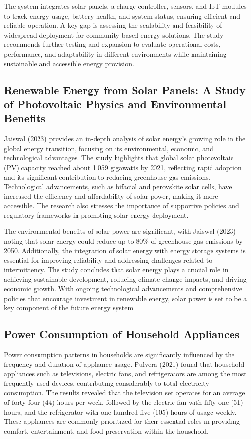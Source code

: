 {The system integrates solar panels, a charge controller, sensors, and IoT modules to track energy usage, battery health, and system status, ensuring efficient and reliable operation. A key gap is assessing the scalability and feasibility of widespread deployment for community-based energy solutions. The study recommends further testing and expansion to evaluate operational costs, performance, and adaptability in different environments while maintaining sustainable and accessible energy provision.

\subsection{Renewable Energy from Solar Panels: A Study of  Photovoltaic Physics and Environmental Benefits}
Jaiswal (2023) provides an in-depth analysis of solar energy’s growing role in the global energy transition, focusing on its environmental, economic, and technological advantages. The study highlights that global solar photovoltaic (PV) capacity reached about 1,059 gigawatts by 2021, reflecting rapid adoption and its significant contribution to reducing greenhouse gas emissions. Technological advancements, such as bifacial and perovskite solar cells, have increased the efficiency and affordability of solar power, making it more accessible. The research also stresses the importance of supportive policies and regulatory frameworks in promoting solar energy deployment.

The environmental benefits of solar power are significant, with Jaiswal (2023) noting that solar energy could reduce up to 80\% of greenhouse gas emissions by 2050. Additionally, the integration of solar energy with energy storage systems is essential for improving reliability and addressing challenges related to intermittency. The study concludes that solar energy plays a crucial role in achieving sustainable development, reducing climate change impacts, and driving economic growth. With ongoing technological advancements and comprehensive policies that encourage investment in renewable energy, solar power is set to be a key component of the future energy system 

\subsection{Power Consumption of Household Appliances}
Power consumption patterns in households are significantly influenced by the frequency and duration of appliance usage. Pulvera (2021) found that household appliances such as televisions, electric fans, and refrigerators are among the most frequently used devices, contributing considerably to total electricity consumption. The results revealed that the television set operates for an average of forty-four (44) hours per week, followed by the electric fan with fifty-one (51) hours, and the refrigerator with one hundred five (105) hours of usage weekly. These appliances are commonly prioritized for their essential roles in providing comfort, entertainment, and food preservation within the household.

}

